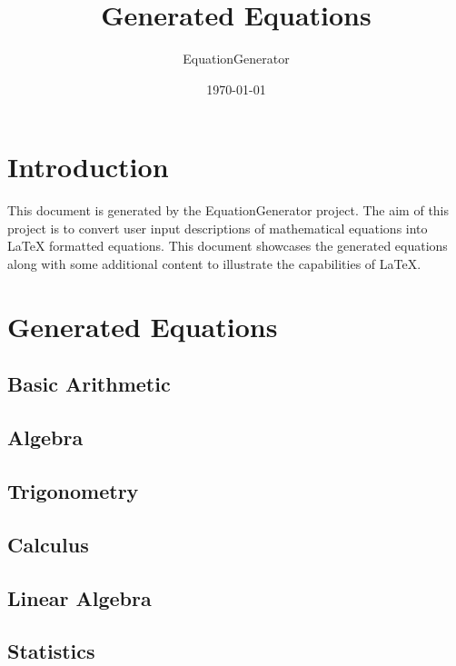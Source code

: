 \documentclass{article}
\begin{document}
\title{Generated Equations}
\author{EquationGenerator}
\date{\today}
\maketitle

\tableofcontents
\newpage

\section{Introduction}
This document is generated by the EquationGenerator project. The aim of this project is to convert user input descriptions of mathematical equations into LaTeX formatted equations. This document showcases the generated equations along with some additional content to illustrate the capabilities of LaTeX.

\section{Generated Equations}

\subsection{Basic Arithmetic}


\subsection{Algebra}


\subsection{Trigonometry}


\subsection{Calculus}


\subsection{Linear Algebra}


\subsection{Statistics}

\end{document}
